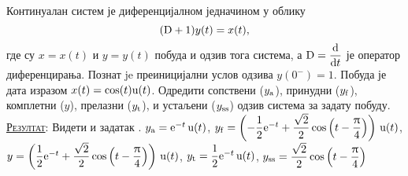 \PID
Континуалан 
систем је 
диференцијалном једначином у облику 
$$
({\rm D} + 1) y(t) = x(t),
$$ где су 
$x = x(t)$ и $y = y(t)$ побуда и одзив 
тога система, а 
${\rm D} = \dfrac{{\rm d}}{{\rm d} t}$ је 
оператор диференцирања. 
Познат je преиницијални услов 
одзива $y(0^-) = 1$.
Побуда је дата изразом 
$x(t) = \cos(t) {\rm u}(t)$. Одредити сопствени
($y_{\rm a}$), 
принудни
($y_{\rm f}$), 
комплетни
($y$), 
прелазни
($y_{\rm t}$),
 и устаљени
($y_{\rm ss}$) одзив система за задату побуду.
\\[2mm]

\textsc{\underline{Резултат}}: Видети и задатак \label{z:RL_kolo}.
$y_{\rm a} = {\rm e}^{-t} \, {\rm u}(t)$, 
$y_{\rm f} = 
\left( 
-\dfrac{1}{2} {\rm e}^{-t} 
+ \dfrac{\sqrt 2}{2} 
\cos
\left(
t - \dfrac{\uppi}{4}
\right)
\right)\,{\rm u}(t)$, \\
$y = 
\left( 
\dfrac{1}{2} {\rm e}^{-t} 
+ \dfrac{\sqrt 2}{2} 
\cos
\left(
t - \dfrac{\uppi}{4}
\right)
\right)\,{\rm u}(t)
$, 
$
y_{\rm t} = 
\dfrac{1}{2} {\rm e}^{-t} \, {\rm u}(t)
$,
$y_{\rm ss} = 
\dfrac{\sqrt 2}{ 2} 
\cos
\left(
t - \dfrac{\uppi}{4}
\right)
$